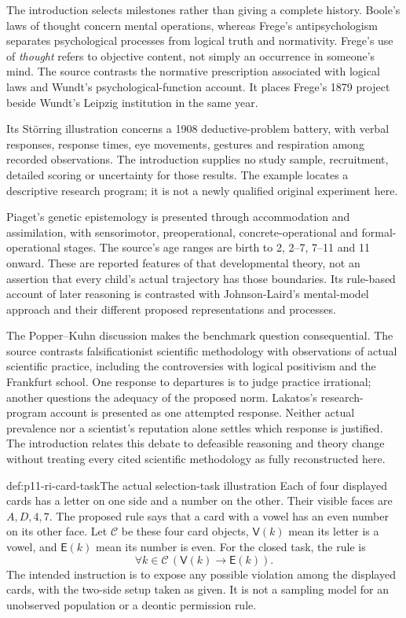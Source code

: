 The introduction selects milestones rather than giving a complete
history. Boole's laws of thought concern mental operations, whereas
Frege's antipsychologism separates psychological processes from logical
truth and normativity. Frege's use of \emph{thought} refers to objective
content, not simply an occurrence in someone's mind. The source contrasts
the normative prescription associated with logical laws and Wundt's
psychological-function account. It places Frege's 1879 project beside
Wundt's Leipzig institution in the same year.

Its Störring illustration concerns a 1908 deductive-problem battery,
with verbal responses, response times, eye movements, gestures and
respiration among recorded observations. The introduction supplies no
study sample, recruitment, detailed scoring or uncertainty for those
results. The example locates a descriptive research program; it is
not a newly qualified original experiment here.

Piaget's genetic epistemology is presented through accommodation and
assimilation, with sensorimotor, preoperational, concrete-operational
and formal-operational stages. The source's age ranges are birth to
2, 2--7, 7--11 and 11 onward. These are reported features of that
developmental theory, not an assertion that every child's actual
trajectory has those boundaries. Its rule-based account of later
reasoning is contrasted with Johnson-Laird's mental-model approach
and their different proposed representations and processes.

The Popper--Kuhn discussion makes the benchmark question consequential.
The source contrasts falsificationist scientific methodology with
observations of actual scientific practice, including the controversies
with logical positivism and the Frankfurt school. One response to
departures is to judge practice irrational; another questions the
adequacy of the proposed norm. Lakatos's research-program account is
presented as one attempted response. Neither actual prevalence nor a
scientist's reputation alone settles which response is justified.
The introduction relates this debate to defeasible reasoning and
theory change without treating every cited scientific methodology
as fully reconstructed here.

\begin{hbdefinition}{def:p11-ri-card-task}{The actual selection-task illustration}
Each of four displayed cards has a letter on one side and a number
on the other. Their visible faces are \(A,D,4,7\). The proposed
rule says that a card with a vowel has an even number on its other
face. Let \(\mathcal C\) be these four card objects,
\(\mathsf V(k)\) mean its letter is a vowel, and
\(\mathsf E(k)\) mean its number is even. For the closed task,
the rule is
\[
 \forall k\in\mathcal C\,(\mathsf V(k)\to\mathsf E(k)).
\]
The intended instruction is to expose any possible violation among
the displayed cards, with the two-side setup taken as given. It is
not a sampling model for an unobserved population or a deontic
permission rule.
\cite[p.~5]{KnauffSpohn2021FrameworksIntro}
\end{hbdefinition}

